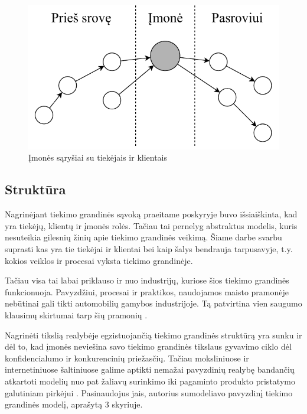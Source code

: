 \begin{figure}[H]
    \centering
    \includegraphics[scale=0.8]{images/supply-chain-upstream-downstream}
    \caption{Įmonės sąryšiai su tiekėjais ir klientais \cite{christopher2016logistics}}
\end{figure}




\subsection{Struktūra}

Nagrinėjant tiekimo grandinės sąvoką praeitame poskyryje buvo išsiaiškinta, kad yra tiekėjų, klientų ir įmonės rolės. Tačiau tai pernelyg abstraktus modelis, kuris nesuteikia gilesnių žinių apie tiekimo grandinės veikimą. Šiame darbe svarbu suprasti kas yra tie tiekėjai ir klientai bei kaip šalys bendrauja tarpusavyje, t.y. kokios veiklos ir procesai vyksta tiekimo grandinėje. 

Tačiau visa tai labai priklauso ir nuo industrijų, kuriose šios tiekimo grandinės funkcionuoja. Pavyzdžiui, procesai ir praktikos, naudojamos maisto pramonėje nebūtinai gali tikti automobilių gamybos industrijoje. Tą patvirtina vien saugumo klausimų skirtumai tarp šių pramonių \cite{marucheck2011product}.

Nagrinėti tikslią realybėje egzistuojančią tiekimo grandinės struktūrą yra sunku ir dėl to, kad įmonės neviešina savo tiekimo grandinės tikslaus gyvavimo ciklo dėl konfidencialumo ir konkurencinių priežasčių. Tačiau moksliniuose ir internetiniuose šaltiniuose galime aptikti nemažai pavyzdinių realybę bandančių atkartoti modelių nuo pat žaliavų surinkimo iki pagaminto produkto pristatymo galutiniam pirkėjui \cite{christopher2016logistics, webber2009building, patrick2017continuous, justin2016customer}. Pasinaudojus jais, autorius sumodeliavo pavyzdinį tiekimo grandinės modelį, aprašytą 3 skyriuje.

